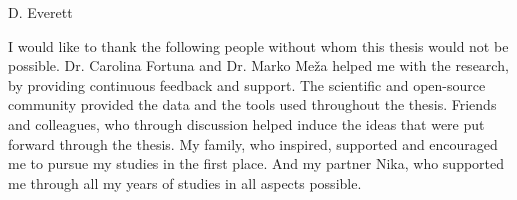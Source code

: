 \documentclass[
11pt, %
english, %
singlespacing, %
headsepline, %
]{MastersDoctoralThesis} %
\begin{document}
\hfill D. Everett 


\begin{acknowledgements}
  \addchaptertocentry{\acknowledgementname} %
  I would like to thank the following people without whom this thesis would not be possible.
  Dr. Carolina Fortuna and Dr. Marko Meža helped me with the research, by providing continuous feedback and support.
  The scientific and open-source community provided the data and the tools used throughout the thesis.
  Friends and colleagues, who through discussion helped induce the ideas that were put forward through the thesis. 
  My family, who inspired, supported and encouraged me to pursue my studies in the first place.
  And my partner Nika, who supported me through all my years of studies in all aspects possible.
  
\end{acknowledgements}









\tableofcontents %

\listoffigures %

\listoftables %

\end{document}
